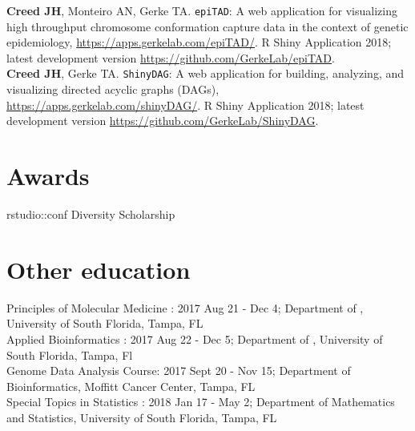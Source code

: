 \documentclass[11pt, a4paper]{article} %
\newcommand{\years}[1]{\marginnote{\scriptsize \raise .3ex\hbox{#1}}} %
\begin{document}
{\bf Creed JH}, Monteiro AN, Gerke TA. \verb|epiTAD|: A web application for visualizing high throughput chromosome conformation capture data in the context of genetic epidemiology, \href{https://apps.gerkelab.com/epiTAD/}{https://apps.gerkelab.com/epiTAD/}. R Shiny Application 2018; latest development version \href{https://github.com/GerkeLab/epiTAD}{https://github.com/GerkeLab/epiTAD}.\\

{\bf Creed JH}, Gerke TA. \verb|ShinyDAG|: A web application for building, analyzing, and visualizing directed acyclic graphs (DAGs), \href{https://apps.gerkelab.com/shinyDAG/}{https://apps.gerkelab.com/shinyDAG/}. R Shiny Application 2018; latest development version \href{https://github.com/GerkeLab/ShinyDAG}{https://github.com/GerkeLab/ShinyDAG}.

\section*{Awards}

\years{2018} rstudio::conf Diversity Scholarship


\section*{Other education}

Principles of Molecular Medicine : 2017 Aug 21 - Dec 4; Department of , University of South Florida, Tampa, FL\\

Applied Bioinformatics : 2017 Aug 22 - Dec 5; Department of , University of South Florida, Tampa, Fl \\

Genome Data Analysis Course:  2017 Sept 20 - Nov 15; Department of Bioinformatics, Moffitt Cancer Center, Tampa, FL \\

Special Topics in Statistics :  2018 Jan 17 -  May 2; Department of Mathematics and Statistics, University of South Florida, Tampa, FL




\end{document}

